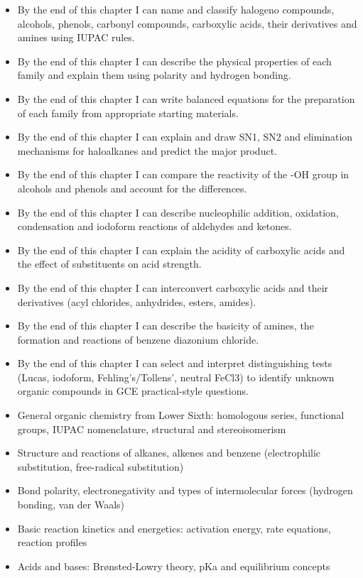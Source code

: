 \documentclass[11pt]{article}
\begin{document}
\begin{objectifs}
\begin{itemize}
\item By the end of this chapter I can name and classify halogeno compounds, alcohols, phenols, carbonyl compounds, carboxylic acids, their derivatives and amines using IUPAC rules.
\item By the end of this chapter I can describe the physical properties of each family and explain them using polarity and hydrogen bonding.
\item By the end of this chapter I can write balanced equations for the preparation of each family from appropriate starting materials.
\item By the end of this chapter I can explain and draw SN1, SN2 and elimination mechanisms for haloalkanes and predict the major product.
\item By the end of this chapter I can compare the reactivity of the -OH group in alcohols and phenols and account for the differences.
\item By the end of this chapter I can describe nucleophilic addition, oxidation, condensation and iodoform reactions of aldehydes and ketones.
\item By the end of this chapter I can explain the acidity of carboxylic acids and the effect of substituents on acid strength.
\item By the end of this chapter I can interconvert carboxylic acids and their derivatives (acyl chlorides, anhydrides, esters, amides).
\item By the end of this chapter I can describe the basicity of amines, the formation and reactions of benzene diazonium chloride.
\item By the end of this chapter I can select and interpret distinguishing tests (Lucas, iodoform, Fehling's/Tollens', neutral FeCl3) to identify unknown organic compounds in GCE practical-style questions.
\end{itemize}
\end{objectifs}

\begin{prerequis}
\begin{itemize}
\item General organic chemistry from Lower Sixth: homologous series, functional groups, IUPAC nomenclature, structural and stereoisomerism
\item Structure and reactions of alkanes, alkenes and benzene (electrophilic substitution, free-radical substitution)
\item Bond polarity, electronegativity and types of intermolecular forces (hydrogen bonding, van der Waals)
\item Basic reaction kinetics and energetics: activation energy, rate equations, reaction profiles
\item Acids and bases: Brønsted-Lowry theory, pKa and equilibrium concepts
\end{itemize}
\end{prerequis}
\end{document}
